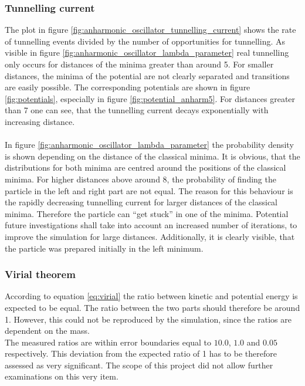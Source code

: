 \documentclass{scrartcl}
\begin{document}
	\subsubsection{Tunnelling current}
		The plot in figure \ref{fig:anharmonic_oscillator_tunnelling_current} shows the rate of tunnelling events divided by the number of opportunities for tunnelling.
		As visible in figure \ref{fig:anharmonic_oscillator_lambda_parameter} real tunnelling only occurs for distances of the minima greater than around 5.
		For smaller distances, the minima of the potential are not clearly separated and transitions are easily possible.
		The corresponding potentials are shown in figure \ref{fig:potentials}, especially in figure \ref{fig:potential_anharm5}.
		For distances greater than 7 one can see, that the tunnelling current decays exponentially with increasing distance.
		\\
		\\
		In figure \ref{fig:anharmonic_oscillator_lambda_parameter} the probability density is shown depending on the distance of the classical minima.
		It is obvious, that the distributions for both minima are centred around the positions of the classical minima.
		For higher distances above around 8, the probability of finding the particle in the left and right part are not equal.
		The reason for this behaviour is the rapidly decreasing tunnelling current for larger distances of the classical minima.
		Therefore the particle can \enquote{get stuck} in one of the minima.
		Potential future investigations shall take into account an increased number of iterations, to improve the simulation for large distances.
		Additionally, it is clearly visible, that the particle was prepared initially in the left minimum.

	\subsubsection{Virial theorem}
		According to equation \ref{eq:virial} the ratio between kinetic and potential energy is expected to be equal.
		The ratio between the two parts should therefore be around 1.
		However, this could not be reproduced by the simulation, since the ratios are dependent on the mass.
		\\
		The measured ratios are within error boundaries equal to $10.0$, $1.0$ and $0.05$ respectively.
		This deviation from the expected ratio of 1 has to be therefore assessed as very significant.
		The scope of this project did not allow further examinations on this very item.
\end{document}

